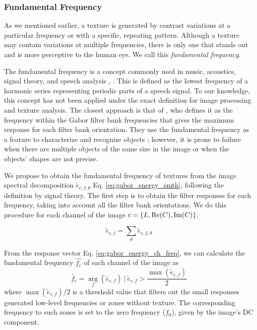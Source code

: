 \subsubsection{Fundamental Frequency}
As we mentioned earlier, a texture is generated by contrast variations at a particular frequency or with a specific, repeating pattern. Although a texture may contain variations at multiple frequencies, there is only one that stands out and is more perceptive to the human eye. We call this \textit{fundamental frequency}.

The fundamental frequency is a concept commonly used in music, acoustics, signal theory, and speech analysis \citep{Benward:BOOK:2014}, \citep{Sigmund:ITC:2013}. This is defined as the lowest frequency of a harmonic series representing periodic parts of a speech signal. To our knowledge, this concept has not been applied under the exact definition for image processing and texture analysis. The closest approach is that of \cite{Kamarainen.Kyrki.ea:ICPR:2002}, who defines it as the frequency within the Gabor filter bank frequencies that gives the maximum response for each filter bank orientation. They use the fundamental frequency as a feature to characterize and recognize objects \citep{Kamarainen.Kyrki.ea:DSP:2002}; however, it is prone to failure when there are multiple objects of the same size in the image or when the objects' shapes are not precise.

We propose to obtain the fundamental frequency of textures from the image spectral decomposition $\widetilde{e}_{c, f, \theta}$ Eq. \eqref{eq:gabor_energy_smth}, following the definition by signal theory. The first step is to obtain the filter responses for each frequency, taking into account all the filter bank orientations. We do this procedure for each channel of the image $c=\{L, \mathrm{Re}(C), \mathrm{Im}(C)\}$.

\begin{equation}
	\widetilde{e}_{c, f} =  \underset{\theta }{\sum} \widetilde{e}_{c, f, \theta}  \label{eq:gabor_energy_ch_freq}
\end{equation}

From the response vector Eq. \eqref{eq:gabor_energy_ch_freq}, we can calculate the fundamental frequency $\widehat{f_c}$ of each channel of the image as
\begin{equation}
	\widetilde{f_c} =  \underset{f}{\arg} (\widetilde{e}_{c, f}) ~|~ \widetilde{e}_{c, f} > \frac{\max(\widetilde{e}_{c, f})}{2} \label{eq:fundamental_frequencygabor_ch}
\end{equation}
where $\max(\widetilde{e}_{c, f})/2$ is a threshold value that filters out the small responses generated low-level frequencies or zones without texture. The corresponding frequency to such zones is set to the zero frequency ($f_0$), given by the image's DC component.

